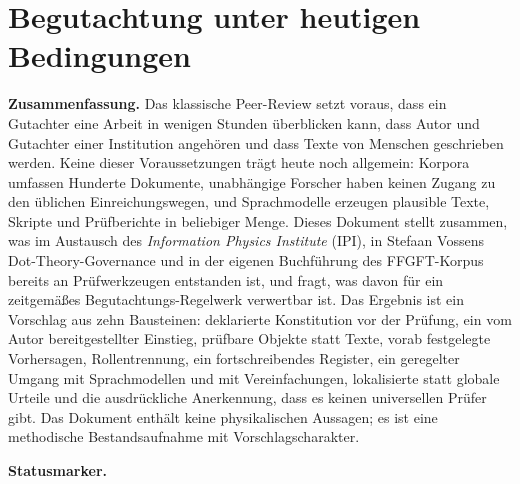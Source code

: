 
\providecommand{\BM}{\textbf{[B]}}
\providecommand{\KM}{\textbf{[K]}}
\providecommand{\SM}{\textbf{[S]}}
\providecommand{\XM}{\textbf{[X]}}
\providecommand{\QM}{\textbf{[Q]}}

\chapter*{Begutachtung unter heutigen Bedingungen}

{\small\noindent\textbf{Zusammenfassung.}\quad\ignorespaces
Das klassische Peer-Review setzt voraus, dass ein Gutachter eine Arbeit in wenigen
Stunden überblicken kann, dass Autor und Gutachter einer Institution angehören und
dass Texte von Menschen geschrieben werden. Keine dieser Voraussetzungen trägt
heute noch allgemein: Korpora umfassen Hunderte Dokumente, unabhängige Forscher
haben keinen Zugang zu den üblichen Einreichungswegen, und Sprachmodelle erzeugen
plausible Texte, Skripte und Prüfberichte in beliebiger Menge. Dieses Dokument
stellt zusammen, was im Austausch des \emph{Information Physics Institute} (IPI),
in Stefaan Vossens Dot-Theory-Governance und in der eigenen Buchführung des
FFGFT-Korpus bereits an Prüfwerkzeugen entstanden ist, und fragt, was davon für ein
zeitgemäßes Begutachtungs-Regelwerk verwertbar ist. Das Ergebnis ist ein Vorschlag
aus zehn Bausteinen: deklarierte Konstitution vor der Prüfung, ein vom Autor
bereitgestellter Einstieg, prüfbare Objekte statt Texte, vorab festgelegte
Vorhersagen, Rollentrennung, ein fortschreibendes Register, ein geregelter
Umgang mit Sprachmodellen und mit Vereinfachungen, lokalisierte statt globale
Urteile und die ausdrückliche Anerkennung, dass es keinen universellen Prüfer gibt.
Das Dokument enthält keine physikalischen Aussagen; es ist eine methodische
Bestandsaufnahme mit Vorschlagscharakter.
}\medskip

\medskip\noindent\textbf{Statusmarker.}


